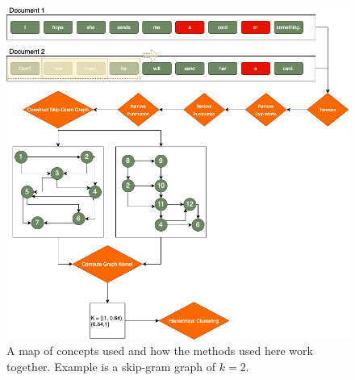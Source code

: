 \begin{figure}
 \includegraphics[width=6in]{Content/Images/Concept_map.png}
 \caption{A map of concepts used and how the methods used here work together. Example is a skip-gram graph of $k=2$.}
 \end{figure}

